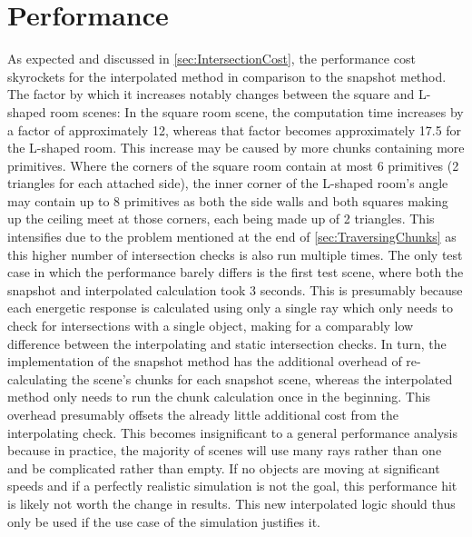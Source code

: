\section{Performance}

As expected and discussed in \autoref{sec:IntersectionCost},
the performance cost skyrockets for the interpolated method in comparison to the snapshot method.
The factor by which it increases notably changes between the square and L-shaped room scenes:
In the square room scene, the computation time increases by a factor of approximately 12,
whereas that factor becomes approximately 17.5 for the L-shaped room.
\newline
This increase may be caused by more chunks containing more primitives.
Where the corners of the square room contain at most 6 primitives (2 triangles for each attached side),
the inner corner of the L-shaped room's angle may contain up to 8 primitives
as both the side walls and both squares making up the ceiling meet at those corners,
each being made up of 2 triangles.
This intensifies due to the problem mentioned at the end of \autoref{sec:TraversingChunks}
as this higher number of intersection checks is also run multiple times.
\newline
The only test case in which the performance barely differs is the first test scene,
where both the snapshot and interpolated calculation took 3 seconds.
This is presumably because each energetic response is calculated using only a single ray
which only needs to check for intersections with a single object,
making for a comparably low difference between the interpolating and static intersection checks.
\newline
In turn, the implementation of the snapshot method has the additional overhead of re-calculating the scene's chunks for each snapshot scene,
whereas the interpolated method only needs to run the chunk calculation once in the beginning.
This overhead presumably offsets the already little additional cost from the interpolating check.
\newline
This becomes insignificant to a general performance analysis because in practice,
the majority of scenes will use many rays rather than one and be complicated rather than empty.
If no objects are moving at significant speeds and if a perfectly realistic simulation is not the goal,
this performance hit is likely not worth the change in results.
This new interpolated logic should thus only be used if the use case of the simulation justifies it.

